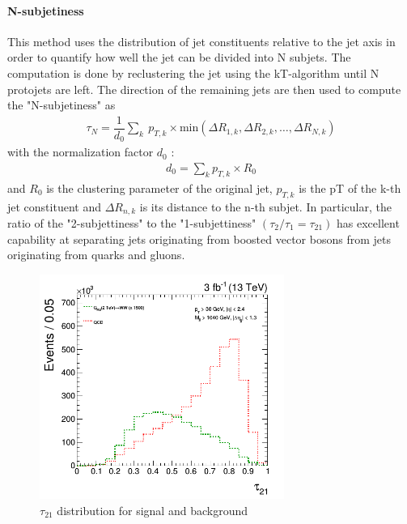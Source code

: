 \paragraph{N-subjetiness}\label{tau21sec}
This method uses the distribution of jet constituents relative to the jet axis in order to quantify how well the jet can be divided into N subjets. The computation is done by reclustering the jet using the kT-algorithm until N protojets are left. The direction of the remaining jets are then used to compute the "N-subjetiness" as
\begin{eqnarray}
\tau_{N}=\dfrac{1}{d_{0}} \sum_{k}\: p_{T,k}\times \text{min}\left( \Delta R_{1,k}, \Delta R_{2,k},\dots,\Delta R_{N,k}\right) 
\end{eqnarray}
with the normalization factor $d_{0}$ :
\begin{eqnarray}
d_{0} = \sum_{k} p_{T,k}\times R_{0}
\end{eqnarray}
and $R_{0}$ is the clustering parameter of the original jet, $p_{ T,k}$ is the pT of the k-th jet constituent and $\Delta R_{n,k}$ is its distance to the n-th subjet. In particular, the ratio of the "2-subjettiness" to the "1-subjettiness" $(\tau_{2} / \tau_{1} = \tau_{21} )$ has excellent capability at separating jets originating from boosted vector bosons from jets originating from quarks and gluons.
\begin{figure}[H]
\caption{$\tau_{21}$ distribution for signal and background \label{jettau21figure}}
  \centering
\includegraphics[width=8cm]{physics_objects_plots/tau21}
\end{figure}

